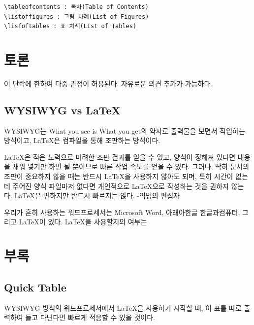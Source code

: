 \documentclass[11pt]{article}
\begin{document}
\begin{verbatim}
\tableofcontents : 목차(Table of Contents)	
\listoffigures : 그림 차례(List of Figures)
\lisfoftables : 표 차례(LIst of Tables)
\end{verbatim}




\section{토론}
이 단락에 한하여 다중 관점이 허용된다. 자유로운 의견 추가가 가능하다.

\subsection{WYSIWYG vs LaTeX}
WYSIWYG는 What you see is What you get의 약자로 출력물을 보면서 작업하는 
방식이고, LaTeX은 컴파일을 통해 조판하는 방식이다.

LaTeX은 적은 노력으로 미려한 조판 결과를 얻을 수 있고, 양식이 정해져 있다면 
내용을 채워 넣기만 하면 될 뿐이므로 빠른 작업 속도를 얻을 수 있다.
그러나, 딱히 문서의 조판이 중요하지 않을 때는 반드시 LaTeX을 사용하지 않아도 
되며, 특히 시간이 없는데 주어진 양식 파일마저 없다면 개인적으로 LaTeX으로 
작성하는 것을 권하지 않는다. LaTeX은 편하지만 반드시 빠르지는 않다. -익명의 
편집자

우리가 흔히 사용하는 워드프로세서는 Microsoft Word, 아래아한글 한글과컴퓨터,
 그리고 \LaTeX 이 있다. \LaTeX 을 사용할지의 여부는 
\section{부록}

\clearpage
\subsection{Quick Table}
WYSIWYG 방식의 워드프로세서에서 \LaTeX 을 사용하기 시작할 때, 이 표를 따로 출력하여 들고 다닌다면 빠르게 적응할 수 있을 것이다.
\end{document}
